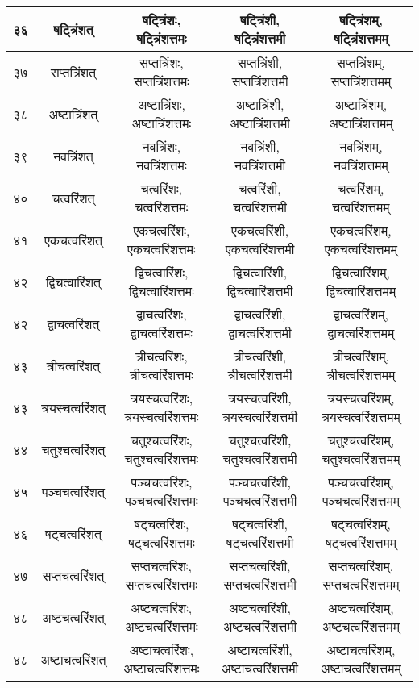 \documentclass[leqno,fleqn,12pt]{article}%
\begin{document}
\begin{center}
\begin{supertabular}{|lc|c|c|c|}
३६ & षट्त्रिंशत् & षट्त्रिंशः, षट्त्रिंशत्तमः & षट्त्रिंशी, षट्त्रिंशत्तमी & षट्त्रिंशम्, षट्त्रिंशत्तमम् \\ \hline 
३७ & सप्तत्रिंशत् & सप्तत्रिंशः, सप्तत्रिंशत्तमः & सप्तत्रिंशी, सप्तत्रिंशत्तमी & सप्तत्रिंशम्, सप्तत्रिंशत्तमम् \\ \hline 
३८ & अष्टात्रिंशत् & अष्टात्रिंशः, अष्टात्रिंशत्तमः & अष्टात्रिंशी, अष्टात्रिंशत्तमी & अष्टात्रिंशम्, अष्टात्रिंशत्तमम् \\ \hline 
३९ & नवत्रिंशत् & नवत्रिंशः, नवत्रिंशत्तमः & नवत्रिंशी, नवत्रिंशत्तमी & नवत्रिंशम्, नवत्रिंशत्तमम् \\ \hline 
४० & चत्वरिंशत् & चत्वरिंशः, चत्वरिंशत्तमः & चत्वरिंशी, चत्वरिंशत्तमी & चत्वरिंशम्, चत्वरिंशत्तमम् \\ \hline 
४१ & एकचत्वरिंशत् & एकचत्वरिंशः, एकचत्वरिंशत्तमः & एकचत्वरिंशी, एकचत्वरिंशत्तमी & एकचत्वरिंशम्, एकचत्वरिंशत्तमम् \\ \hline 
४२ & द्विचत्वारिंशत् & द्विचत्वारिंशः, द्विचत्वारिंशत्तमः & द्विचत्वारिंशी, द्विचत्वारिंशत्तमी & द्विचत्वारिंशम्, द्विचत्वारिंशत्तमम् \\ \hline 
४२ & द्वाचत्वरिंशत् & द्वाचत्वरिंशः, द्वाचत्वरिंशत्तमः & द्वाचत्वरिंशी, द्वाचत्वरिंशत्तमी & द्वाचत्वरिंशम्, द्वाचत्वरिंशत्तमम् \\ \hline 
४३ & त्रीचत्वरिंशत् & त्रीचत्वरिंशः, त्रीचत्वरिंशत्तमः & त्रीचत्वरिंशी, त्रीचत्वरिंशत्तमी & त्रीचत्वरिंशम्, त्रीचत्वरिंशत्तमम् \\ \hline 
४३ & त्रयस्चत्वरिंशत् & त्रयस्चत्वरिंशः, त्रयस्चत्वरिंशत्तमः & त्रयस्चत्वरिंशी, त्रयस्चत्वरिंशत्तमी & त्रयस्चत्वरिंशम्, त्रयस्चत्वरिंशत्तमम् \\ \hline 
४४ & चतुश्चत्वरिंशत् & चतुश्चत्वरिंशः, चतुश्चत्वरिंशत्तमः & चतुश्चत्वरिंशी, चतुश्चत्वरिंशत्तमी & चतुश्चत्वरिंशम्, चतुश्चत्वरिंशत्तमम् \\ \hline 
४५ & पञ्चचत्वरिंशत् & पञ्चचत्वरिंशः, पञ्चचत्वरिंशत्तमः & पञ्चचत्वरिंशी, पञ्चचत्वरिंशत्तमी & पञ्चचत्वरिंशम्, पञ्चचत्वरिंशत्तमम् \\ \hline 
४६ & षट्चत्वरिंशत् & षट्चत्वरिंशः, षट्चत्वरिंशत्तमः & षट्चत्वरिंशी, षट्चत्वरिंशत्तमी & षट्चत्वरिंशम्, षट्चत्वरिंशत्तमम् \\ \hline 
४७ & सप्तचत्वरिंशत् & सप्तचत्वरिंशः, सप्तचत्वरिंशत्तमः & सप्तचत्वरिंशी, सप्तचत्वरिंशत्तमी & सप्तचत्वरिंशम्, सप्तचत्वरिंशत्तमम् \\ \hline 
४८ & अष्टचत्वरिंशत् & अष्टचत्वरिंशः, अष्टचत्वरिंशत्तमः & अष्टचत्वरिंशी, अष्टचत्वरिंशत्तमी & अष्टचत्वरिंशम्, अष्टचत्वरिंशत्तमम् \\ \hline 
४८ & अष्टाचत्वरिंशत् & अष्टाचत्वरिंशः, अष्टाचत्वरिंशत्तमः & अष्टाचत्वरिंशी, अष्टाचत्वरिंशत्तमी & अष्टाचत्वरिंशम्, अष्टाचत्वरिंशत्तमम् \\ \hline 

\end{supertabular}
\end{center}
\end{document}
